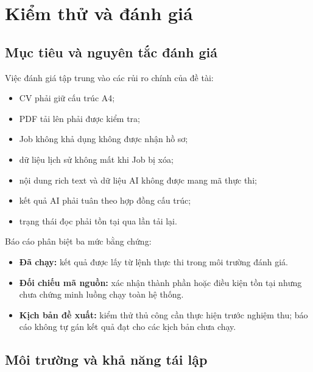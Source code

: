 \chapter{Kiểm thử và đánh giá}

\section{Mục tiêu và nguyên tắc đánh giá}

Việc đánh giá tập trung vào các rủi ro chính của đề tài:

\begin{itemize}
    \item CV phải giữ cấu trúc A4;
    \item PDF tải lên phải được kiểm tra;
    \item Job không khả dụng không được nhận hồ sơ;
    \item dữ liệu lịch sử không mất khi Job bị xóa;
    \item nội dung rich text và dữ liệu AI không được mang mã thực thi;
    \item kết quả AI phải tuân theo hợp đồng cấu trúc;
    \item trạng thái đọc phải tồn tại qua lần tải lại.
\end{itemize}

Báo cáo phân biệt ba mức bằng chứng:

\begin{itemize}
    \item \textbf{Đã chạy:} kết quả được lấy từ lệnh thực thi trong môi trường đánh giá.
    \item \textbf{Đối chiếu mã nguồn:} xác nhận thành phần hoặc điều kiện tồn tại nhưng chưa chứng minh luồng chạy toàn hệ thống.
    \item \textbf{Kịch bản đề xuất:} kiểm thử thủ công cần thực hiện trước nghiệm thu; báo cáo không tự gán kết quả đạt cho các kịch bản chưa chạy.
\end{itemize}

\section{Môi trường và khả năng tái lập}

